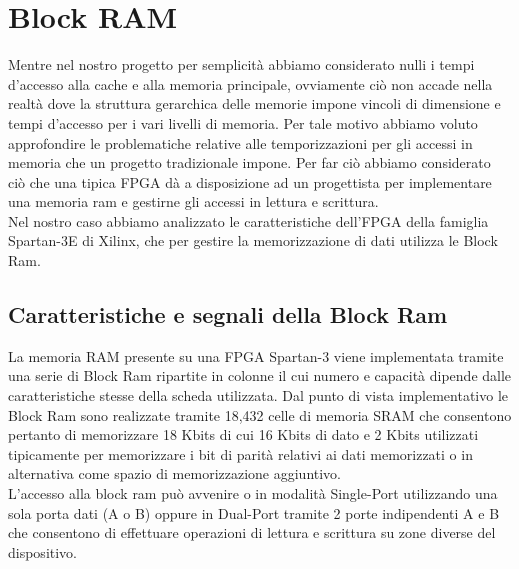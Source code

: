 ﻿\clearpage{\pagestyle{empty}\cleardoublepage}
\chapter{Block RAM}


Mentre nel nostro progetto per semplicit\`a  abbiamo considerato nulli i tempi d'accesso alla cache e alla memoria principale, ovviamente ci\`o non accade nella realt\`a dove la struttura gerarchica delle memorie impone vincoli di dimensione e tempi d'accesso per i vari livelli di memoria. Per tale motivo abbiamo voluto approfondire le problematiche relative alle temporizzazioni per gli accessi in memoria che un progetto tradizionale impone. Per far ci\`o abbiamo considerato ci\`o che una tipica FPGA d\`a a disposizione ad un progettista per implementare una memoria ram e gestirne gli accessi in lettura e scrittura.
\\
Nel nostro caso abbiamo analizzato le caratteristiche dell'FPGA della famiglia Spartan-3E di Xilinx, che per gestire la memorizzazione di dati utilizza le Block Ram.

\section{Caratteristiche e segnali della Block Ram}

La memoria RAM presente su una FPGA Spartan-3 viene implementata tramite una serie di Block Ram ripartite in colonne il cui numero e capacit\`a dipende dalle caratteristiche stesse della scheda utilizzata. Dal punto di vista implementativo le Block Ram sono realizzate tramite 18,432 celle di memoria SRAM che consentono pertanto di memorizzare 18 Kbits di cui 16 Kbits di dato e 2 Kbits utilizzati tipicamente per memorizzare i bit di parit\`a relativi ai dati memorizzati o in alternativa come spazio di memorizzazione aggiuntivo.\\
L'accesso alla block ram pu\`o avvenire o in modalit\`a Single-Port utilizzando una sola porta dati (A o B) oppure in Dual-Port  tramite 2 porte indipendenti A e B che consentono di effettuare operazioni di lettura e scrittura su zone diverse del dispositivo.

